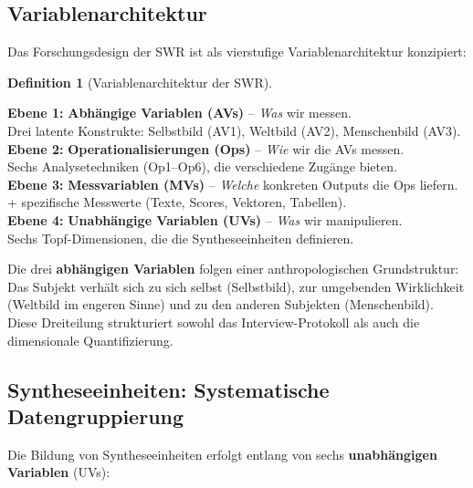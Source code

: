 \documentclass[11pt,a4paper]{article}
\theoremstyle{definition}
\newtheorem{definition}{Definition}[section]
\theoremstyle{plain}
\theoremstyle{remark}
\begin{document}
\subsection{Variablenarchitektur}
\label{sec:variablen}

Das Forschungsdesign der SWR ist als vierstufige Variablenarchitektur konzipiert:

\begin{definition}[Variablenarchitektur der SWR]
\label{def:architektur}
\begin{tabbing}
\textbf{Ebene 1:} \= \textbf{Abh\"angige Variablen (AVs)} -- \emph{Was} wir messen. \\
                   \> Drei latente Konstrukte: Selbstbild (AV1), Weltbild (AV2), Menschenbild (AV3). \\[0.5em]
\textbf{Ebene 2:} \> \textbf{Operationalisierungen (Ops)} -- \emph{Wie} wir die AVs messen. \\
                   \> Sechs Analysetechniken (Op1--Op6), die verschiedene Zug\"ange bieten. \\[0.5em]
\textbf{Ebene 3:} \> \textbf{Messvariablen (MVs)} -- \emph{Welche} konkreten Outputs die Ops liefern. \\
                   + spezifische Messwerte (Texte, Scores, Vektoren, Tabellen). \\[0.5em]
\textbf{Ebene 4:} \> \textbf{Unabh\"angige Variablen (UVs)} -- \emph{Was} wir manipulieren. \\
                   \> Sechs Topf-Dimensionen, die die Syntheseeinheiten definieren.
\end{tabbing}
\end{definition}

Die drei \textbf{abh\"angigen Variablen} folgen einer anthropologischen Grundstruktur: Das Subjekt verh\"alt sich zu sich selbst (Selbstbild), zur umgebenden Wirklichkeit (Weltbild im engeren Sinne) und zu den anderen Subjekten (Menschenbild). Diese Dreiteilung strukturiert sowohl das Interview-Protokoll als auch die dimensionale Quantifizierung.


\subsection{Syntheseeinheiten: Systematische Datengruppierung}
\label{sec:syntheseeinheiten}

Die Bildung von Syntheseeinheiten erfolgt entlang von sechs \textbf{unabh\"angigen Variablen} (UVs):
\end{document}
